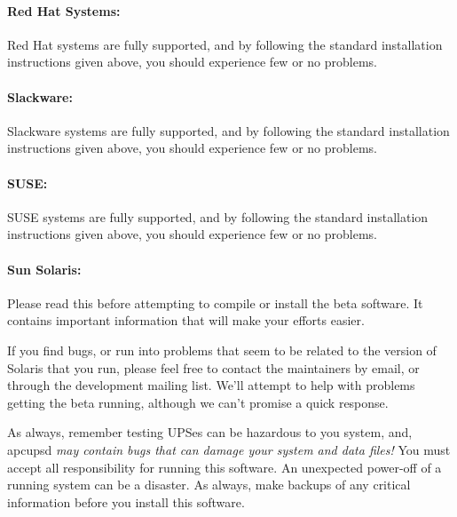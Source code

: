 \label{Red-Hat-Systems}

\paragraph*{Red Hat Systems:}

\label{index-Red-Hat-44}
\label{index-OS_002c-Red-Hat-45}
Red Hat systems are fully supported, and by following the standard
installation instructions given above, you should experience few or no
problems. 

\label{Slackware}

\paragraph*{Slackware:}

\label{index-Slackware-46}
\label{index-OS_002c-Slackware-47}
Slackware systems are fully supported, and by following the standard
installation instructions given above, you should experience few or no
problems. 

\label{SUSE}

\paragraph*{SUSE:}

\label{index-SuSE-48}
\label{index-OS_002c-SuSE-49}
SUSE systems are fully supported, and by following the standard installation
instructions given above, you should experience few or no problems. 

\label{Sun-Solaris}

\paragraph*{Sun Solaris:}

\label{index-Sun-50}
\label{index-Solaris-51}
\label{index-OS_002c-Solaris-52}
Please read this before attempting to compile or install the beta software. It
contains important information that will make your efforts easier.  

If you find bugs, or run into problems that seem to be related to the version
of Solaris that you run, please feel free to contact the maintainers by email,
or through the development mailing list. We'll attempt to help with problems
getting the beta running, although we can't promise a quick response.  

As always, remember testing UPSes can be hazardous to you system, and, apcupsd
{\it may contain bugs that can damage your system and data files!} You must
accept all responsibility for running this software. An unexpected power-off
of a running system can be a disaster. As always, make backups of any critical
information before you install this software.  


